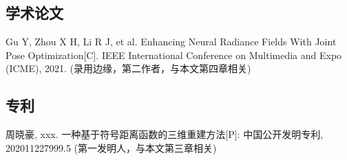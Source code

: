
\begin{resume}

   \subsection*{学术论文}

   \begin{achievements}
   	\item Gu Y, Zhou X H, Li R J, et al. Enhancing Neural Radiance Fields With Joint Pose Optimization[C]. IEEE International Conference on Multimedia and Expo (ICME), 2021. (录用边缘，第二作者，与本文第四章相关)
   	
   \end{achievements}


  \subsection*{专利}

  \begin{achievements}
    \item 周晓豪, xxx. 一种基于符号距离函数的三维重建方法[P]: 中国公开发明专利, 202011227999.5 (第一发明人，与本文第三章相关)
    
    
  \end{achievements}

\end{resume}
